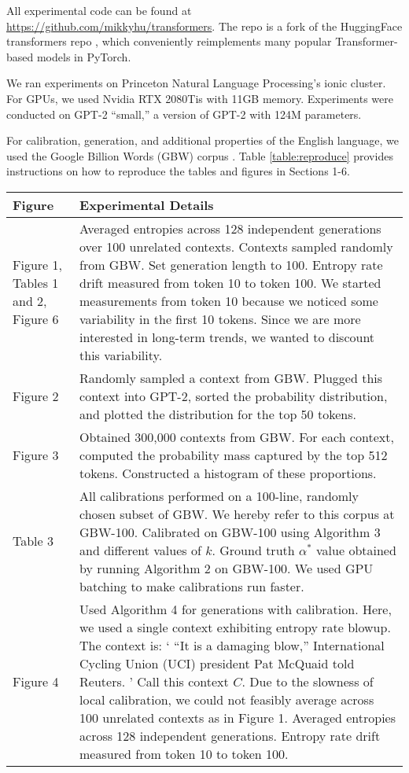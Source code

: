 \documentclass[pageno]{jpaper}
\begin{document}
All experimental code can be found at \url{https://github.com/mikkyhu/transformers}. The repo is a fork of the HuggingFace transformers repo \cite{Wolf2019HuggingFacesTS}, which conveniently reimplements many popular Transformer-based models in PyTorch.

We ran experiments on Princeton Natural Language Processing's ionic cluster. For GPUs, we used Nvidia RTX 2080Tis with 11GB memory. Experiments were conducted on GPT-2 ``small,'' a version of GPT-2 with 124M parameters.

For calibration, generation, and additional properties of the English language, we used the Google Billion Words (GBW) corpus \cite{gbw}. Table \ref{table:reproduce} provides instructions on how to reproduce the tables and figures in Sections 1-6.

\begin{table}[ht]
    \centering
    \begin{tabular}[t]{|p{}|p{}|}
    \hline
    Figure & Experimental Details \\
    \hline
    \hline
    Figure 1, Tables 1 and 2, Figure 6 & Averaged entropies across 128 independent generations over 100 unrelated contexts. Contexts sampled randomly from GBW. Set generation length to 100. Entropy rate drift measured from token 10 to token 100. We started measurements from token 10 because we noticed some variability in the first 10 tokens. Since we are more interested in long-term trends, we wanted to discount this variability. \\
    \hline
    Figure 2  & Randomly sampled a context from GBW. Plugged this context into GPT-2, sorted the probability distribution, and plotted the distribution for the top 50 tokens.  \\
    \hline
    Figure 3 & Obtained 300,000 contexts from GBW. For each context, computed the probability mass captured by the top 512 tokens. Constructed a histogram of these proportions. \\
    \hline
    Table 3 & All calibrations performed on a 100-line, randomly chosen subset of GBW. We hereby refer to this corpus at GBW-100. Calibrated on GBW-100 using Algorithm 3 and different values of $k$. Ground truth $\alpha^*$ value obtained by running Algorithm 2 on GBW-100. We used GPU batching to make calibrations run faster. \\
    \hline
    Figure 4 & Used Algorithm 4 for generations with calibration. Here, we used a single context exhibiting entropy rate blowup. The context is: ` ``It is a damaging blow,'' International Cycling Union (UCI) president Pat McQuaid told Reuters. ' Call this context $C$. Due to the slowness of local calibration, we could not feasibly average across 100 unrelated contexts as in Figure 1. Averaged entropies across 128 independent generations. Entropy rate drift measured from token 10 to token 100. \\

\end{tabular}
\end{table}
\end{document}
